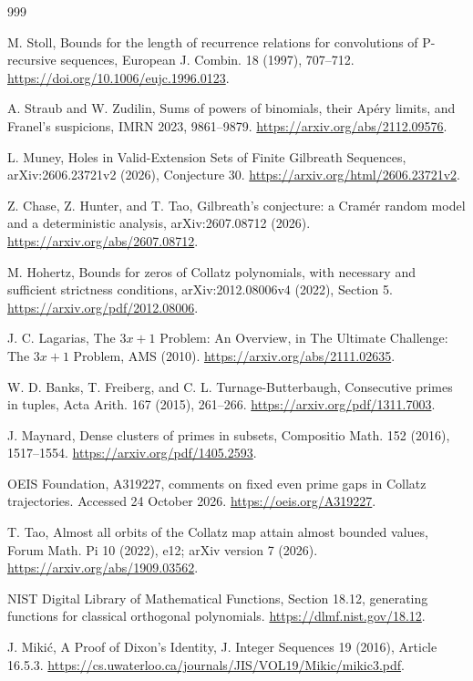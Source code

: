 \documentclass[11pt,a4paper]{article}
\theoremstyle{definition}
\theoremstyle{remark}
\numberwithin{equation}{section}
\begin{document}
\begin{thebibliography}{999}\raggedright
{}
M. Stoll, Bounds for the length of recurrence relations for convolutions of P-recursive sequences, European J. Combin. 18 (1997), 707--712. \url{https://doi.org/10.1006/eujc.1996.0123}.

A. Straub and W. Zudilin, Sums of powers of binomials, their Ap\'ery limits, and Franel's suspicions, IMRN 2023, 9861--9879. \url{https://arxiv.org/abs/2112.09576}.

L. Muney, Holes in Valid-Extension Sets of Finite Gilbreath Sequences, arXiv:2606.23721v2 (2026), Conjecture 30. \url{https://arxiv.org/html/2606.23721v2}.

Z. Chase, Z. Hunter, and T. Tao, Gilbreath's conjecture: a Cramér random model and a deterministic analysis, arXiv:2607.08712 (2026). \url{https://arxiv.org/abs/2607.08712}.

M. Hohertz, Bounds for zeros of Collatz polynomials, with necessary and sufficient strictness conditions, arXiv:2012.08006v4 (2022), Section 5. \url{https://arxiv.org/pdf/2012.08006}.

J. C. Lagarias, The $3x+1$ Problem: An Overview, in The Ultimate Challenge: The $3x+1$ Problem, AMS (2010). \url{https://arxiv.org/abs/2111.02635}.

W. D. Banks, T. Freiberg, and C. L. Turnage-Butterbaugh, Consecutive primes in tuples, Acta Arith. 167 (2015), 261--266. \url{https://arxiv.org/pdf/1311.7003}.

J. Maynard, Dense clusters of primes in subsets, Compositio Math. 152 (2016), 1517--1554. \url{https://arxiv.org/pdf/1405.2593}.

OEIS Foundation, A319227, comments on fixed even prime gaps in Collatz trajectories. Accessed 24 October 2026. \url{https://oeis.org/A319227}.

T. Tao, Almost all orbits of the Collatz map attain almost bounded values, Forum Math. Pi 10 (2022), e12; arXiv version 7 (2026). \url{https://arxiv.org/abs/1909.03562}.

NIST Digital Library of Mathematical Functions, Section 18.12, generating functions for classical orthogonal polynomials. \url{https://dlmf.nist.gov/18.12}.

J. Miki\'{c}, A Proof of Dixon's Identity, J. Integer Sequences 19 (2016), Article 16.5.3. \url{https://cs.uwaterloo.ca/journals/JIS/VOL19/Mikic/mikic3.pdf}.


\end{thebibliography}
\end{document}
